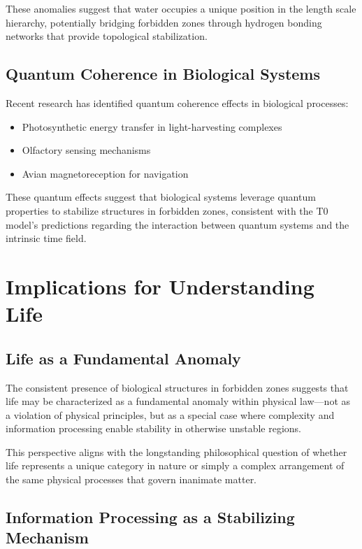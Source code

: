 \documentclass[12pt,a4paper]{article}
\begin{document}
	These anomalies suggest that water occupies a unique position in the length scale hierarchy, potentially bridging forbidden zones through hydrogen bonding networks that provide topological stabilization.
	
	\subsection{Quantum Coherence in Biological Systems}
	\label{subsec:quantum_coherence}
	
	Recent research has identified quantum coherence effects in biological processes:
	
	\begin{itemize}
		\item Photosynthetic energy transfer in light-harvesting complexes
		\item Olfactory sensing mechanisms
		\item Avian magnetoreception for navigation
	\end{itemize}
	
	These quantum effects suggest that biological systems leverage quantum properties to stabilize structures in forbidden zones, consistent with the T0 model's predictions regarding the interaction between quantum systems and the intrinsic time field.
	
	\section{Implications for Understanding Life}
	\label{sec:implications}
	
	\subsection{Life as a Fundamental Anomaly}
	\label{subsec:fundamental_anomaly}
	
	The consistent presence of biological structures in forbidden zones suggests that life may be characterized as a fundamental anomaly within physical law—not as a violation of physical principles, but as a special case where complexity and information processing enable stability in otherwise unstable regions.
	
	This perspective aligns with the longstanding philosophical question of whether life represents a unique category in nature or simply a complex arrangement of the same physical processes that govern inanimate matter.
	
	\subsection{Information Processing as a Stabilizing Mechanism}
	\label{subsec:information_stabilization}
	
\end{document}
